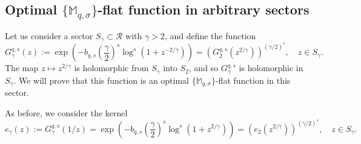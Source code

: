 \documentclass[11pt,a4paper]{article}
\theoremstyle{plain}
\theoremstyle{definition}
\def\ga{\gamma}
\def\Ms{{\mathbb{M}}_{q,\sigma}}
\begin{document}
\subsection{Optimal $\{\Ms\}$-flat function in arbitrary sectors}

Let us consider a sector $S_\gamma\subset\mathcal{R}$ with $\gamma>2$, and define the function
\begin{equation}\label{eq.defGgamma}
G_{\ga}^{q,s}(z):=\exp\left(-b_{q,s}\left(\frac{\gamma}{2}\right)^s \log^s\left(1+z^{-2/\gamma}\right)\right) =\left(G_2^{q,s}(z^{2/\gamma})\right)^{(\gamma/2)^s},\quad z\in S_{\ga}.
\end{equation}
The map $z\mapsto z^{2/\gamma}$ is holomorphic from $S_{\ga}$ into $S_2$, and so $G_{\ga}^{q,s}$ is holomorphic in $S_{\ga}$. We will prove that this function is an optimal $\{\Ms\}$-flat function in this sector.

As before, we consider the kernel
$$e_\gamma(z):=G_{\ga}^{q,s}(1/z)= \exp\left(-b_{q,s}\left(\frac{\gamma}{2}\right)^s \log^s\left(1+z^{2/\gamma}\right)\right) =\left(e_2(z^{2/\gamma})\right)^{(\gamma/2)^s},\quad z\in S_{\ga}.$$
\end{document}
